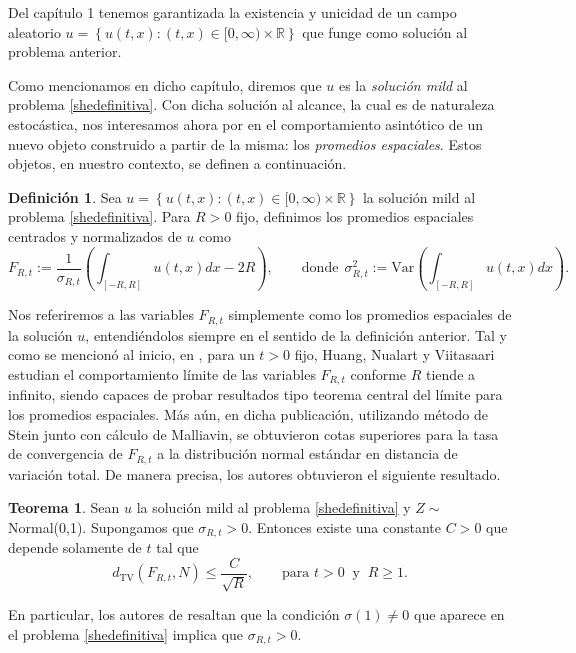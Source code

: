 \documentclass[letterpaper,twoside,12pt]{book}
\newcommand{\R}{\mathbb{R}}
\newcommand{\1}{\mathds{1}}
\theoremstyle{definition}
\newtheorem{dfn}{Definición}
\theoremstyle{definition}
\newtheorem{teo}{Teorema}
\theoremstyle{remark}
\theoremstyle{definition}
\theoremstyle{definition}
\theoremstyle{definition}
\theoremstyle{definition}
\theoremstyle{definition}
\begin{document}
Del capítulo 1 tenemos garantizada la existencia y unicidad de un campo aleatorio  $u=\left\{u(t,x):(t,x)\in [0,\infty)\times\R\right\}$ que funge como solución al problema anterior. 

Como mencionamos en dicho capítulo, diremos que $u$ es la \textit{solución mild} al problema \eqref{shedefinitiva}. Con dicha solución al alcance, la cual es de naturaleza estocástica, nos interesamos ahora por en el comportamiento asintótico de un nuevo objeto construido a partir de la misma: los \textit{promedios espaciales}. Estos objetos, en nuestro contexto, se definen a continuación. 

\begin{dfn}\label{defpromediosespaciales}
 Sea $u=\left\{u(t,x):(t,x)\in [0,\infty)\times\R\right\}$ la solución mild al problema \eqref{shedefinitiva}. Para $R>0$ fijo, definimos los promedios espaciales centrados y normalizados de $u$ como 
 \begin{equation*}
   F_{R,t}:=\frac{1}{\sigma_{R,t}}\left(\int_{[-R,R]}u(t,x)dx -2R\right), \qquad \text{donde} \ \ \sigma^2_{R,t}:=\text{Var}\left(\int_{[-R,R]}u(t,x)dx\right).
\end{equation*}
 \end{dfn}
Nos referiremos a las variables $F_{R,t}$ simplemente como los promedios espaciales de la solución $u$, entendiéndolos siempre en el sentido de la definición anterior. Tal y como se mencionó al inicio, en \cite{HUANG20207170}, para un $t>0$ fijo, Huang, Nualart y Viitasaari estudian el comportamiento límite de las variables $F_{R,t}$ conforme $R$ tiende a infinito, siendo capaces de probar resultados tipo teorema central del límite para los promedios espaciales. Más aún, en dicha publicación, utilizando método de Stein junto con cálculo de Malliavin, se obtuvieron cotas superiores para la tasa de convergencia de $F_{R,t}$ a la distribución normal estándar en distancia de variación total. De manera precisa, los autores obtuvieron el siguiente resultado.

\begin{teo} 
 Sean $u$ la solución mild al problema \eqref{shedefinitiva} y $Z\sim$ Normal(0,1). Supongamos que $\sigma_{R,t}>0$. Entonces existe una constante $C>0$ que depende solamente de $t$ tal que 
 \begin{equation}
    d_{\text{TV}}(F_{R,t},N)\leq \frac{C}{\sqrt{R}}, \qquad \text{para }t>0 \ \text{ y } \ R\geq1.  
 \end{equation}
 \end{teo}
En particular, los autores de \cite{HUANG20207170} resaltan que la condición $\sigma(1)\neq 0$ que aparece en el problema \eqref{shedefinitiva} implica que $\sigma_{R,t}>0$.
\end{document}
